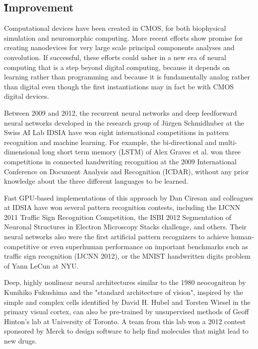 \documentclass[12pt]{article}
\begin{document}
\subsection{\H Improvement}
Computational devices have been created in CMOS, for both biophysical simulation and neuromorphic computing. More recent efforts show promise for creating nanodevices for very large scale principal components analyses and convolution. If successful, these efforts could usher in a new era of neural computing that is a step beyond digital computing, because it depends on learning rather than programming and because it is fundamentally analog rather than digital even though the first instantiations may in fact be with CMOS digital devices.

Between 2009 and 2012, the recurrent neural networks and deep feedforward neural networks developed in the research group of Jürgen Schmidhuber at the Swiss AI Lab IDSIA have won eight international competitions in pattern recognition and machine learning. For example, the bi-directional and multi-dimensional long short term memory (LSTM) of Alex Graves et al. won three competitions in connected handwriting recognition at the 2009 International Conference on Document Analysis and Recognition (ICDAR), without any prior knowledge about the three different languages to be learned.

Fast GPU-based implementations of this approach by Dan Ciresan and colleagues at IDSIA have won several pattern recognition contests, including the IJCNN 2011 Traffic Sign Recognition Competition, the ISBI 2012 Segmentation of Neuronal Structures in Electron Microscopy Stacks challenge, and others. Their neural networks also were the first artificial pattern recognizers to achieve human-competitive or even superhuman performance on important benchmarks such as traffic sign recognition (IJCNN 2012), or the MNIST handwritten digits problem of Yann LeCun at NYU.

Deep, highly nonlinear neural architectures similar to the 1980 neocognitron by Kunihiko Fukushima and the "standard architecture of vision", inspired by the simple and complex cells identified by David H. Hubel and Torsten Wiesel in the primary visual cortex, can also be pre-trained by unsupervised methods of Geoff Hinton's lab at University of Toronto. A team from this lab won a 2012 contest sponsored by Merck to design software to help find molecules that might lead to new drugs.\cite{wiki:003}
\end{document}
